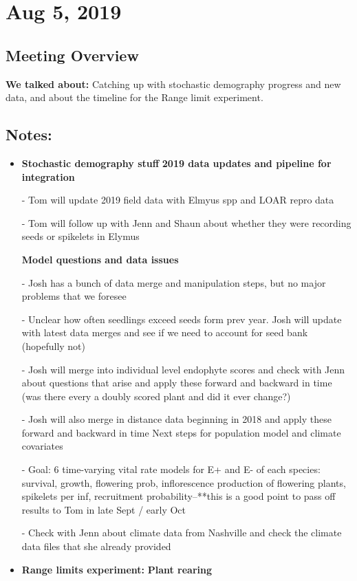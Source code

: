 \documentclass{article}
\begin{document}
\section*{Aug 5, 2019}
\subsection*{Meeting Overview}
\textbf{We talked about:}
Catching up with stochastic demography progress and new data, and about the timeline for the Range limit experiment.

\subsection*{Notes:}
\begin{itemize}
\item{\textbf{Stochastic demography stuff}
\textbf{2019 data updates and pipeline for integration}

-   Tom will update 2019 field data with Elmyus spp and LOAR repro data

-   Tom will follow up with Jenn and Shaun about whether they were recording seeds or spikelets in Elymus

\textbf{Model questions and data issues}

-   Josh has a bunch of data merge and manipulation steps, but no major problems that we foresee

-   Unclear how often seedlings exceed seeds form prev year. Josh will update with latest data merges and see if we need to account for seed bank (hopefully not)

-   Josh will merge into individual level endophyte scores and check with Jenn about questions that arise and apply these forward and backward in time (was there every a doubly scored plant and did it ever change?)

-   Josh will also merge in distance data beginning in 2018 and apply these forward and backward in time
Next steps for population model and climate covariates

-   Goal: 6 time-varying vital rate models for E+ and E- of each species: survival, growth, flowering prob, inflorescence production of flowering plants, spikelets per inf, recruitment probability--**this is a good point to pass off results to Tom in late Sept / early Oct

-   Check with Jenn about climate data from Nashville and check the climate data files that she already provided}

\item{\textbf{Range limits experiment:}
\textbf{Plant rearing}

}
\end{itemize}
\end{document}

